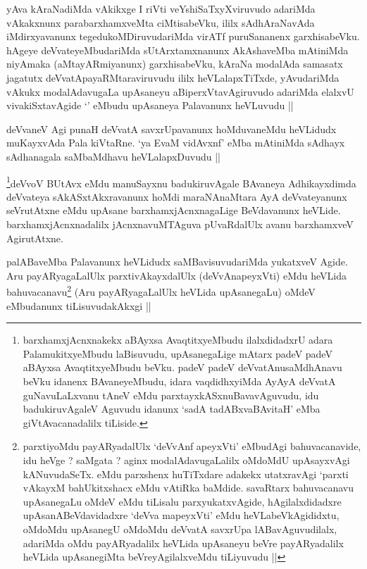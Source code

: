 
\begin{artha}
yAva kAraNadiMda vAkikxge I riVti veYshiSaTxyXviruvudo adariMda vAkakxnunx parabarxhamxveMta ciMtisabeVku, ililx sAdhAraNavAda iMdirxyavanunx tegedukoMDiruvudariMda virATf puruSananenx garxhisabeVku. hAgeye deVvateyeMbudariMda sUtArxtamxnanunx AkAshaveMba mAtiniMda niyAmaka (aMtayARmiyanunx) garxhisabeVku, kAraNa modalAda samasatx jagatutx deVvatApayaRMtaraviruvudu ililx heVLalapxTiTxde, yAvudariMda vAkukx modalAdavugaLa upAsaneyu aBiperxVtavAgiruvudo adariMda elalxvU vivakiSxtavAgide `\stext' eMbudu upAsaneya Palavanunx heVLuvudu ||
\end{artha}

\begin{artha}
deVvaneV Agi punaH deVvatA savxrUpavanunx hoMduvaneMdu heVLidudx muKayxvAda Pala kiVtaRne. `ya EvaM vidAvxnf' eMba mAtiniMda sAdhayx sAdhanagala saMbaMdhavu heVLalapxDuvudu ||
\end{artha}

\begin{artha}
\footnote{barxhamxjAcnxnakekx aBAyxsa AvaqtitxyeMbudu ilalxdidadxrU adara PalamukitxyeMbudu laBisuvudu, upAsanegaLige mAtarx padeV padeV aBAyxsa AvaqtitxyeMbudu beVku. padeV padeV deVvatAnusaMdhAnavu beVku idanenx BAvaneyeMbudu, idara vaqdidhxyiMda AyAyA deVvatA guNavuLaLxvanu tAneV eMdu parxtayxkASxnuBavavAguvudu, idu badukiruvAgaleV Aguvudu idanunx `sadA tadABxvaBAvitaH' eMba giVtAvacanadalilx tiLiside.}deVvoV BUtAvx eMdu manuSayxnu badukiruvAgale BAvaneya Adhikayxdimda deVvateya sAkASxtAkxravanunx hoMdi maraNAnaMtara AyA deVvateyanunx seVrutAtxne eMdu upAsane barxhamxjAcnxnagaLige BeVdavanunx heVLide. barxhamxjAcnxnadalilx jAcnxnavuMTAguva pUvaRdalUlx avanu barxhamxveV AgirutAtxne.
\end{artha}

\begin{artha}
palABaveMba Palavanunx heVLidudx saMBavisuvudariMda yukatxveV Agide. Aru payARyagaLalUlx parxtivAkayxdalUlx (deVvAnapeyxVti) eMdu heVLida bahuvacanavu\footnote{parxtiyoMdu payARyadalUlx `deVvAnf apeyxVti' eMbudAgi bahuvacanavide, idu heVge ? saMgata ? aginx modalAdavugaLalilx oMdoMdU upAsayxvAgi kANuvudaSeTx. eMdu parxshenx huTiTxdare adakekx utatxravAgi `parxti vAkayxM bahUkitxshacx eMdu vAtiRka baMdide. savaRtarx bahuvacanavu upAsanegaLu oMdeV eMdu tiLisalu parxyukatxvAgide, hAgilalxdidadxre upAsanABeVdavidadxre `deVva mapeyxVti' eMdu heVLabeVkAgididxtu, oMdoMdu upAsanegU oMdoMdu deVvatA savxrUpa lABavAguvudilalx, adariMda oMdu payARyadalilx heVLida upAsaneyu beVre payARyadalilx heVLida upAsanegiMta beVreyAgilalxveMdu tiLiyuvudu ||} (Aru payARyagaLalUlx heVLida upAsanegaLu) oMdeV eMbudanunx tiLisuvudakAkxgi ||
\end{artha}

